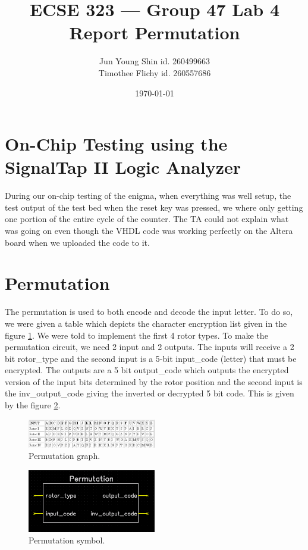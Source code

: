\documentclass[10pt]{article}
\title{ECSE 323 --- Group 47 Lab 4 Report Permutation}
\author{Jun Young Shin id. 260499663\\ Timothee Flichy id. 260557686}
\date{\today}
\begin{document}
\maketitle
\section{On-Chip Testing using the SignalTap II Logic Analyzer}
During our on-chip testing of the enigma, when everything was well setup, the test output of the test bed when the reset key was pressed, we where only getting one portion of the entire cycle of the counter. The TA could not explain what was going on even though the VHDL code was working perfectly on the Altera board when we uploaded the code to it.

\section{Permutation}
The permutation is used to both encode and decode the input letter. To do so, we were given a table which depicts the character encryption list given in the figure \ref{fig:permuation}. We were told to implement the first 4 rotor types. To make the permutation circuit, we need 2 input and 2 outputs. The inputs will receive a 2 bit rotor\_type and the second input is a 5-bit input\_code (letter) that must be encrypted. The outputs are a 5 bit output\_code which outputs the encrypted version of the input bits determined by the rotor position and the second input is the inv\_output\_code giving the inverted or decrypted 5 bit code. This is given by the figure \ref{fig:permuation_sym}.
\begin{figure}[!htb]
    \centering
    \includegraphics[width=0.5\textwidth]{./permutation.png}
    \caption{Permutation graph.}
    \label{fig:permuation}
\end{figure}
\begin{figure}[!htb]
    \centering
    \includegraphics[width=0.5\textwidth]{./permutation_circuit.png}
    \caption{Permutation symbol.}
    \label{fig:permuation_sym}
\end{figure}
\end{document}

